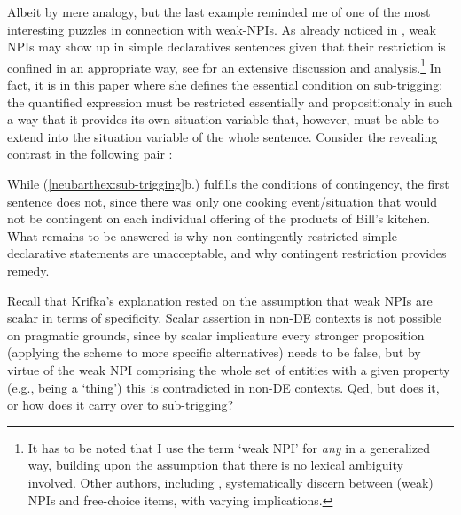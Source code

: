 \documentclass[output=paper,colorlinks,citecolor=brown,
]{langscibook}
\begin{document}
Albeit by mere analogy, but the last example reminded me of one of the most interesting puzzles in connection with
weak-NPIs. As already noticed in \citet{legrand1975}, weak NPIs may show up in simple declaratives sentences given that
their restriction is confined in an appropriate way, see \citet{dayal1998} for an extensive discussion and
analysis.\footnote{It has to be noted that I use the term `weak NPI' for \textit{any} in a generalized way, building upon the assumption
that there is no lexical ambiguity involved. Other authors, including \citet{dayal1998}, systematically
discern between (weak) NPIs and free-choice items, with varying implications.} In fact, it is in this paper where she defines
the essential condition on sub-trigging: the quantified expression must be restricted essentially and propositionaly in such a way that it provides its own situation variable that,
however, must be able to extend into the situation variable of the whole sentence. Consider the revealing contrast in
the following pair \citep{dayal1998}:

\begin{exe}
  \ex\label{neubarthex:sub-trigging}
  \begin{xlist}
  \end{xlist}
\end{exe}

While (\ref{neubarthex:sub-trigging}b.) fulfills the conditions of contingency, the first sentence does not,
since there was only one cooking event/situation that would not be contingent on each individual offering of the
products of Bill's kitchen. What remains to be answered is why non-contingently restricted simple declarative
statements are unacceptable, and why contingent restriction provides remedy.

Recall that Krifka's explanation rested on the assumption that weak NPIs are scalar in terms of specificity. Scalar
assertion in non-DE contexts is not possible on pragmatic grounds, since by scalar implicature every stronger
proposition (applying the scheme to more specific alternatives) needs to be false, but by virtue of the weak NPI
comprising the whole set of entities with a given property (e.g., being a `thing') this is contradicted in non-DE
contexts. Qed, but does it, or how does it carry over to sub-trigging?
\end{document}
